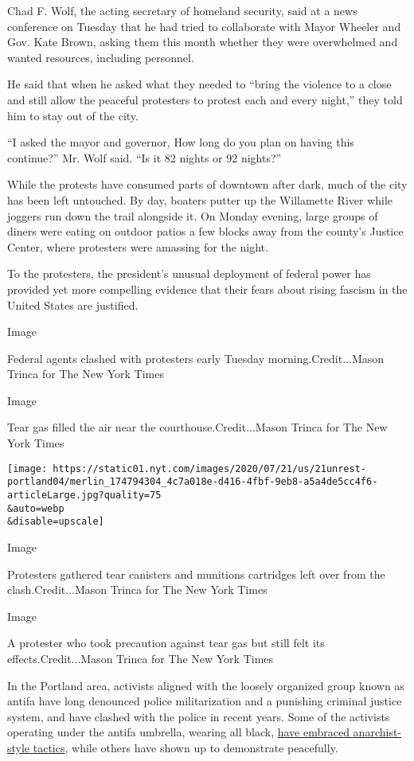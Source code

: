 Chad F. Wolf, the acting secretary of homeland security, said at a news
conference on Tuesday that he had tried to collaborate with Mayor
Wheeler and Gov. Kate Brown, asking them this month whether they were
overwhelmed and wanted resources, including personnel.

He said that when he asked what they needed to ``bring the violence to a
close and still allow the peaceful protesters to protest each and every
night,'' they told him to stay out of the city.

``I asked the mayor and governor, How long do you plan on having this
continue?'' Mr. Wolf said. ``Is it 82 nights or 92 nights?''

While the protests have consumed parts of downtown after dark, much of
the city has been left untouched. By day, boaters putter up the
Willamette River while joggers run down the trail alongside it. On
Monday evening, large groups of diners were eating on outdoor patios a
few blocks away from the county's Justice Center, where protesters were
amassing for the night.

To the protesters, the president's unusual deployment of federal power
has provided yet more compelling evidence that their fears about rising
fascism in the United States are justified.

Image

Federal agents clashed with protesters early Tuesday
morning.Credit...Mason Trinca for The New York Times

Image

Tear gas filled the air near the courthouse.Credit...Mason Trinca for
The New York Times

\texttt{[image: https://static01.nyt.com/images/2020/07/21/us/21unrest-portland04/merlin\_174794304\_4c7a018e-d416-4fbf-9eb8-a5a4de5cc4f6-articleLarge.jpg?quality=75\\\&auto=webp\\\&disable=upscale]}

Image

Protesters gathered tear canisters and munitions cartridges left over
from the clash.Credit...Mason Trinca for The New York Times

Image

A protester who took precaution against tear gas but still felt its
effects.Credit...Mason Trinca for The New York Times

In the Portland area, activists aligned with the loosely organized group
known as antifa have long denounced police militarization and a
punishing criminal justice system, and have clashed with the police in
recent years. Some of the activists operating under the antifa umbrella,
wearing all black,
\href{https://www.nytimes.com/article/what-antifa-trump.html}{have
embraced anarchist-style tactics}, while others have shown up to
demonstrate peacefully.

